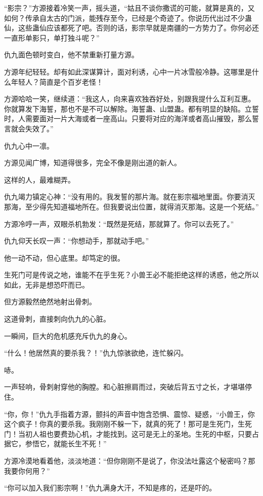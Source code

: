 \begin{this_body}
“影宗？”方源接着冷笑一声，摇头道，“姑且不谈你撒谎的可能，就算是真的，又如何？传承自太古的门派，能残存至今，已经是个奇迹了。你说历代出过不少蛊仙，这些蛊仙应该都死了吧。否则的话，影宗早就是南疆的一方势力了。你何必还一直形单影只，单打独斗呢？”

仇九面色顿时变白，他不禁重新打量方源。

方源年纪轻轻。却有如此深谋算计，面对利诱，心中一片冰雪般冷静。这哪里是什么年轻人？简直是个百岁老怪！

方源哈哈一笑，继续道：“我这人，向来喜欢独吞好处，别跟我提什么互利互惠。你就算发下海誓，那也不是不可以解除。海誓蛊、山盟蛊。都有明显的缺陷。立誓时，人需要面对一片大海或者一座高山。只要将对应的海洋或者高山摧毁，那么誓言就会失效了。”

仇九心中一凛。

方源见闻广博，知道得很多，完全不像是刚出道的新人。

这样的人，最难糊弄。

仇九竭力镇定心神：“没有用的。我发誓的那片海。就在影宗福地里面。你要消灭那海，至少得先知道福地所在。但我要说出位置，就得消灭那海。这是一个死结。”

方源冷哼一声，双眼杀机勃发：“既然是死结，那就算了。你可以去死了。”

仇九仰天长叹一声：“你想动手，那就动手吧。”

他一动不动，但心底里。却笃定的很。

生死门可是传说之地，谁能不在乎生死？小兽王必不能拒绝这样的诱惑，他之所以如此，无非是想恐吓而已。

但方源毅然绝然地射出骨刺。

这道骨刺，直接刺向仇九的心脏。

一瞬间，巨大的危机感充斥仇九的身心。

“什么！他居然真的要杀我？！”仇九惊骇欲绝，连忙躲闪。

哧。

一声轻响，骨刺射穿他的胸膛。和心脏擦肩而过，突破后背五寸之长，才堪堪停住。

“你，你！”仇九手指着方源，颤抖的声音中饱含恐惧、震惊、疑惑，“小兽王，你这个疯子！你真的要杀我。我刚刚不躲一下，就真的死了！那可是生死门，生死门！当初人祖也要费劲心机，才能找到。这可是无上的圣地。生死的中枢，只要占据它，参悟它，就能长生不死！”

方源冷漠地看着他，淡淡地道：“但你刚刚不是说了，你没法吐露这个秘密吗？那我要你何用？”

“你可以加入我们影宗啊！”仇九满身大汗，不知是疼的，还是吓的。


\end{this_body}
